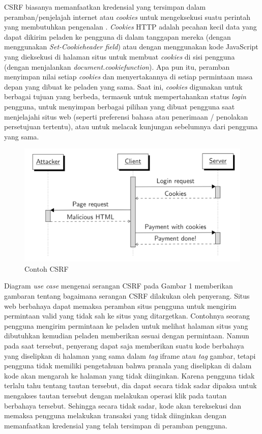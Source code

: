 \documentclass{article}
\begin{document}
CSRF biasanya memanfaatkan kredensial yang tersimpan dalam peramban/penjelajah internet atau \textit{cookies} untuk mengeksekusi suatu perintah yang membutuhkan pengenalan \cite{sanchez2020cookies}. \textit{Cookies} HTTP adalah pecahan kecil data yang dapat dikirim peladen ke pengguna di dalam tanggapan mereka (dengan menggunakan \textit{Set-Cookieheader field}) atau dengan menggunakan kode JavaScript yang dieksekusi di halaman situs untuk membuat \textit{cookies} di sisi pengguna (dengan menjalankan \textit{document.cookiefunction}). Apa pun itu, peramban menyimpan nilai setiap \textit{cookies} dan menyertakannya di setiap permintaan masa depan yang dibuat ke peladen yang sama. Saat ini, \textit{cookies} digunakan untuk berbagai tujuan yang berbeda, termasuk untuk mempertahankan status \textit{login} pengguna, untuk menyimpan berbagai pilihan yang dibuat pengguna saat menjelajahi situs web (seperti preferensi bahasa atau penerimaan / penolakan persetujuan tertentu), atau untuk melacak kunjungan sebelumnya dari pengguna yang sama.


\begin{figure}[htbp]
    \centering
    \includegraphics[scale=.5]{CSRF}
    \caption{Contoh CSRF \cite{calzavara2020security}}
    \label{fig:CSRF}
\end{figure}
Diagram \textit{use case} mengenai serangan CSRF pada Gambar 1 memberikan gambaran tentang bagaimana serangan CSRF dilakukan oleh penyerang. Situs web berbahaya dapat memaksa peramban situs pengguna untuk mengirim permintaan valid yang tidak sah ke situs yang ditargetkan. Contohnya seorang pengguna mengirim permintaan ke peladen untuk melihat halaman situs yang dibutuhkan kemudian peladen memberikan sesuai dengan permintaan. Namun pada saat tersebut, penyerang dapat saja memberikan suatu kode berbahaya yang diselipkan di halaman yang sama dalam \textit{tag} iframe atau \textit{tag} gambar, tetapi pengguna tidak memiliki pengetahuan bahwa pranala yang diselipkan di dalam kode akan mengarah ke halaman yang tidak diinginkan. Karena pengguna tidak terlalu tahu tentang tautan tersebut, dia dapat secara tidak sadar dipaksa untuk mengakses tautan tersebut dengan melakukan operasi klik pada tautan berbahaya tersebut. Sehingga secara tidak sadar, kode akan tereksekusi dan memaksa pengguna melakukan transaksi yang tidak diinginkan dengan memanfaatkan kredensial yang telah tersimpan di peramban pengguna. 
\end{document}
